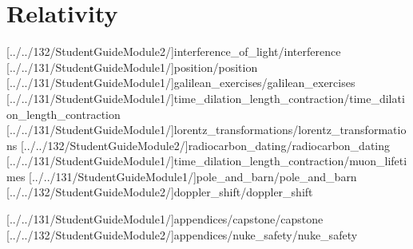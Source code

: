 \documentclass[english,twoside]{article}
\begin{document}


\setcounter{tocdepth}{1}\tableofcontents{}
\cleardoublepage

\part{Relativity}

[../../132/StudentGuideModule2/]{interference_of_light/interference} %
[../../131/StudentGuideModule1/]{position/position}
[../../131/StudentGuideModule1/]{galilean_exercises/galilean_exercises}
[../../131/StudentGuideModule1/]{time_dilation_length_contraction/time_dilation_length_contraction} 
[../../131/StudentGuideModule1/]{lorentz_transformations/lorentz_transformations}
[../../132/StudentGuideModule2/]{radiocarbon_dating/radiocarbon_dating}
[../../131/StudentGuideModule1/]{time_dilation_length_contraction/muon_lifetimes}
[../../131/StudentGuideModule1/]{pole_and_barn/pole_and_barn} 
[../../132/StudentGuideModule2/]{doppler_shift/doppler_shift}



\startappendix
{}
[../../131/StudentGuideModule1/]{appendices/capstone/capstone}
[../../132/StudentGuideModule2/]{appendices/nuke_safety/nuke_safety}

\startinstructornotes
\end{document}
